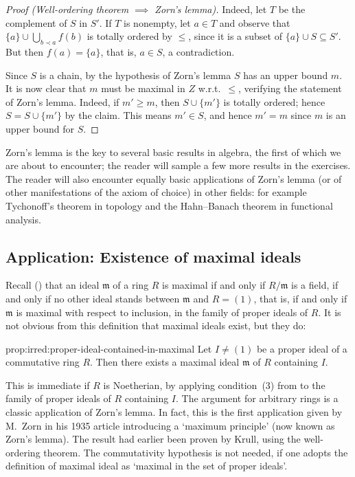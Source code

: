 \begin{proof}[Proof (Well-ordering theorem $\implies$ Zorn's lemma)]
Indeed, let $T$ be the complement of $S$ in $S'$. If $T$ is nonempty,
let $a \in T$ and observe that $\{a\} \cup \bigcup_{b \prec a} f(b)$
is totally ordered by $\leq$, since it is a subset of
$\{a\} \cup S \subseteq S'$. But then $f(a) = \{a\}$, that is,
$a \in S$, a contradiction.

Since $S$ is a chain, by the hypothesis of Zorn's lemma $S$ has an
upper bound $m$. It is now clear that $m$ must be maximal in $Z$
w.r.t.\ $\leq$, verifying the statement of Zorn's lemma. Indeed, if
$m' \geq m$, then $S \cup \{m'\}$ is totally ordered; hence
$S = S \cup \{m'\}$ by the claim. This means $m' \in S$, and hence
$m' = m$ since $m$ is an upper bound for $S$.
\end{proof}

Zorn's lemma is the key to several basic results in algebra, the first
of which we are about to encounter; the reader will sample a few more
results in the exercises. The reader will also encounter equally basic
applications of Zorn's lemma (or of other manifestations of the axiom
of choice) in other fields: for example Tychonoff's theorem in
topology and the Hahn--Banach theorem in functional analysis.

\subsection{Application: Existence of maximal ideals}
\label{subsec:irred:application-existence-of-maximal-ideals}
Recall () that an ideal
$\mathfrak{m}$ of a ring $R$ is maximal if and only if
$R/\mathfrak{m}$ is a field, if and only if no other ideal stands
between $\mathfrak{m}$ and $R = (1)$, that is, if and only if
$\mathfrak{m}$ is maximal with respect to inclusion, in the family of
proper ideals of $R$. It is not obvious from this definition that
maximal ideals exist, but they do:

\begin{prop}{}{prop:irred:proper-ideal-contained-in-maximal}
  Let $I \neq (1)$ be a proper ideal of a commutative ring $R$. Then
  there exists a maximal ideal $\mathfrak{m}$ of $R$ containing $I$.
\end{prop}

This is immediate if $R$ is Noetherian, by applying condition~(3) from
 to the family of proper ideals of $R$ containing
$I$.  The argument for arbitrary rings is a classic application of
Zorn's lemma.  In fact, this is the first application given by M.~Zorn
in his 1935 article introducing a `maximum principle' (now known as
Zorn's lemma).  The result had earlier been proven by Krull, using the
well-ordering theorem. The commutativity hypothesis is not needed, if
one adopts the definition of maximal ideal as `maximal in the set of
proper ideals'.

